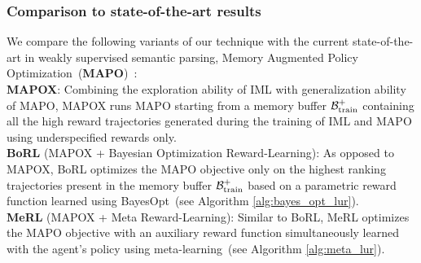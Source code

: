\subsubsection{Comparison to state-of-the-art results} 
We compare the following variants of our technique with the current
state-of-the-art in weakly supervised semantic parsing, Memory
Augmented Policy Optimization~(\textbf{MAPO})~\cite{NIPS2018_8204}:\\[.25cm]
\triangle \textbf{MAPOX}: Combining the exploration ability of IML with generalization ability of MAPO, MAPOX runs MAPO starting from a memory buffer $\mathcal{B}^{+}_{\mathrm{train}}$ containing all the high reward trajectories generated during the training of IML and MAPO using underspecified rewards only.\\[.25cm]
\triangle \textbf{BoRL} (MAPOX + Bayesian Optimization Reward-Learning): As opposed to MAPOX, BoRL optimizes the MAPO objective only on the highest ranking	trajectories present in the memory buffer $\mathcal{B}^{+}_{\mathrm{train}}$ based on a parametric reward function learned using BayesOpt~(see Algorithm \ref{alg:bayes_opt_lur}).\\[.25cm]
\triangle \textbf{MeRL} (MAPOX + Meta Reward-Learning): Similar to BoRL, MeRL optimizes the MAPO objective with an auxiliary reward function simultaneously learned with the agent's policy using meta-learning~(see Algorithm \ref{alg:meta_lur}).